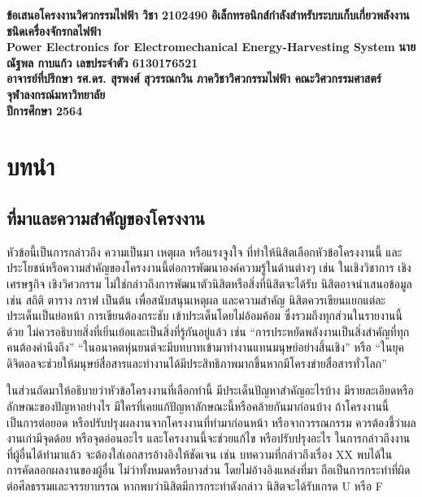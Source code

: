 \documentclass[11pt,a4paper]{article}
\begin{document}
\thispagestyle{empty}
\begin{center}
    \doublespacing
    {\LARGE \bf ข้อเสนอโครงงานวิศวกรรมไฟฟ้า วิชา 2102490}
    \vfill
    {
        \LARGE \bf
        อิเล็กทรอนิกส์กำลังสำหรับระบบเก็บเกี่ยวพลังงานชนิดเครื่องจักรกลไฟฟ้า \\[2ex]
        Power Electronics for Electromechanical Energy-Harvesting System
    }
    \vfill
    {\LARGE \bf นายณัฐพล กาบแก้ว เลขประจำตัว 6130176521}\\[2ex]
    {\LARGE \bf อาจารย์ที่ปรึกษา รศ.ดร. สุรพงศ์ สุวรรณกวิน}
    \vfill
    {\LARGE \bf ภาควิชาวิศวกรรมไฟฟ้า คณะวิศวกรรมศาสตร์}\\[2ex]
    {\LARGE \bf จุฬาลงกรณ์มหาวิทยาลัย}\\[2ex]
    {\LARGE \bf ปีการศึกษา 2564}
\end{center}

\newpage
\thispagestyle{empty}
\tableofcontents

\newpage
\setcounter{page}{1}
\section{บทนำ}
\subsection{ที่มาและความสำคัญของโครงงาน}
หัวข้อนี้เป็นการกล่าวถึง ความเป็นมา เหตุผล หรือแรงจูงใจ ที่ทำให้นิสิตเลือกหัวข้อโครงงานนี้ และประโยชน์หรือความสำคัญของโครงงานนี้ต่อการพัฒนาองค์ความรู้ในด้านต่างๆ เช่น ในเชิงวิชาการ เชิงเศรษฐกิจ เชิงวิศวกรรม ไม่ใช่กล่าวถึงการพัฒนาตัวนิสิตหรือสิ่งที่นิสิตจะได้รับ นิสิตอาจนำเสนอข้อมูล เช่น สถิติ ตาราง กราฟ เป็นต้น เพื่อสนับสนุนเหตุผล และความสำคัญ นิสิตควรเขียนแยกแต่ละประเด็นเป็นย่อหน้า การเขียนต้องกระชับ เข้าประเด็นโดยไม่อ้อมค้อม ซึ่งรวมถึงทุกส่วนในรายงานนี้ด้วย ไม่ควรอธิบายสิ่งที่เยิ่นเย้อและเป็นสิ่งที่รู้กันอยู่แล้ว เช่น “การประหยัดพลังงานเป็นสิ่งสำคัญที่ทุกคนต้องคำนึงถึง” “ในอนาคตหุ่นยนต์จะมีบทบาทเข้ามาทำงานแทนมนุษย์อย่างสิ้นเชิง” หรือ “ในยุคดิจิตอลจะช่วยให้มนุษย์สื่อสารและทำงานได้มีประสิทธิภาพมากขึ้นหากมีโครงข่ายสื่อสารทั่วโลก”


ในส่วนถัดมาให้อธิบายว่าหัวข้อโครงงานที่เลือกทำนี้ มีประเด็นปัญหาสำคัญอะไรบ้าง มีรายละเอียดหรือลักษณะของปัญหาอย่างไร มีใครที่เคยแก้ปัญหาลักษณะนี้หรือคล้ายกันมาก่อนบ้าง ถ้าโครงงานนี้เป็นการต่อยอด หรือปรับปรุงผลงานจากโครงงานที่ทำมาก่อนหน้า หรือจากวรรณกรรม ควรต้องชี้ว่าผลงานเก่ามีจุดด้อย หรือจุดอ่อนอะไร และโครงงานนี้จะช่วยแก้ไข หรือปรับปรุงอะไร ในการกล่าวถึงงานที่ผู้อื่นได้ทำมาแล้ว จะต้องใส่เอกสารอ้างอิงให้ชัดเจน เช่น บทความที่กล่าวถึงเรื่อง XX พบได้ใน ~\cite{WaJ:08} การคัดลอกผลงานของผู้อื่น ไม่ว่าทั้งหมดหรือบางส่วน โดยไม่อ้างอิงแหล่งที่มา ถือเป็นการกระทำที่ผิดต่อศีลธรรมและจรรยาบรรณ หากพบว่านิสิตมีการกระทำดังกล่าว นิสิตจะได้รับเกรด U หรือ F
\end{document}

